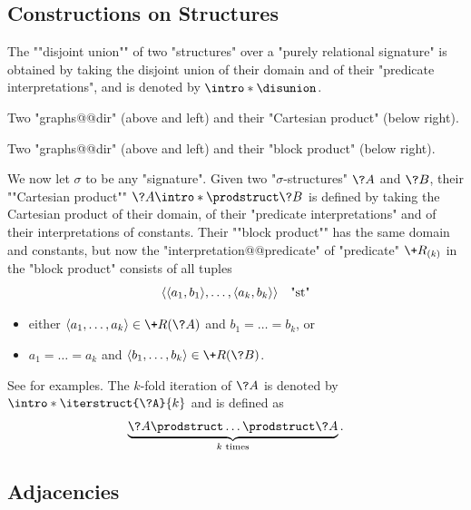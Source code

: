 \subsection{Constructions on Structures}

The \AP""disjoint union"" of two "structures" over a
"purely relational signature" 
is obtained by taking the disjoint union of their domain and of
their "predicate interpretations", and is denoted by \AP$\intro*\disunion$.

\begin{marginfigure}
	\centering
	\begin{tikzpicture}
		
	\end{tikzpicture}
	\caption{
		\AP\label{fig:general-prelim-product-Cartesian}
		Two "graphs@@dir" (above and left) and their "Cartesian product" (below right).
	}
\end{marginfigure}
\begin{marginfigure}
	\centering
	\begin{tikzpicture}
		
	\end{tikzpicture}
	\caption{
		\AP\label{fig:general-prelim-product-block}
		Two "graphs@@dir" (above and left) and their "block product" (below right).
	}
\end{marginfigure}
We now let $\sigma$ to be any "signature".
Given two "$\sigma$-structures" $\?A$ and $\?B$, their
""Cartesian product"" \AP$\?A \intro*\prodstruct \?B$
is defined by taking the Cartesian product of their domain, of
their "predicate interpretations" and of their interpretations of constants. 
Their ""block product"" has the same domain and constants,
but now the "interpretation@@predicate" of "predicate" $\+R_{(k)}$
in the "block product" consists of all tuples
\[\tup{\tup{a_1,b_1}, \dotsc, \tup{a_k,b_k}} \quad\text{"st"}\] 
\begin{itemize}
	\item either $\tup{a_1, \dotsc, a_k} \in \+R(\?A)$ and $b_1 = \dotsc = b_k$, or
	\item $a_1 = \dotsc = a_k$ and $\tup{b_1, \dotsc, b_k} \in \+R(\?B)$.
\end{itemize} 
See  for examples.
The $k$-fold iteration of $\?A$ is denoted by
$\intro*\iterstruct{\?A}{k}$ and is defined as
\[
	\underbrace{\?A \prodstruct \dotsc \prodstruct \?A}_{k \text{ times}}.
\]

\subsection{Adjacencies}


